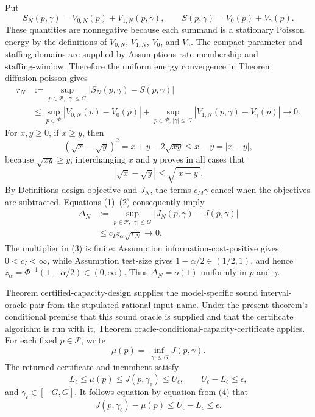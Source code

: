 Put
\[
 S_N(p,\gamma)=V_{0,N}(p)+V_{1,N}(p,\gamma),
 \qquad
 S(p,\gamma)=V_0(p)+V_\gamma(p).
\]
These quantities are nonnegative because each summand is a stationary Poisson energy by the definitions of \(V_{0,N}\), \(V_{1,N}\), \(V_0\), and \(V_\gamma\).  The compact parameter and staffing domains are supplied by Assumptions \(\mathrm{rate\mbox{-}membership}\) and \(\mathrm{staffing\mbox{-}window}\).  Therefore the uniform energy convergence in Theorem \(\mathrm{diffusion\mbox{-}poisson}\) gives
\[
\begin{aligned}
 r_N
 &:={\sup}_{p\in\mathcal P,\,|\gamma|\leq G}
       |S_N(p,\gamma)-S(p,\gamma)| \\
 &\leq {\sup}_{p\in\mathcal P}|V_{0,N}(p)-V_0(p)|
   +{\sup}_{p\in\mathcal P,\,|\gamma|\leq G}
       |V_{1,N}(p,\gamma)-V_\gamma(p)|
 \longrightarrow 0 .                                      \tag{1}
\end{aligned}
\]
For \(x,y\geq0\), if \(x\geq y\), then
\[
 (\sqrt{x}-\sqrt{y})^2
 =x+y-2\sqrt{xy}
 \leq x-y=|x-y|,
\]
because \(\sqrt{xy}\geq y\); interchanging \(x\) and \(y\) proves in all cases that
\[
 |\sqrt{x}-\sqrt{y}|\leq\sqrt{|x-y|}.                       \tag{2}
\]
By Definitions \(\mathrm{design\mbox{-}objective}\) and \(J_N\), the terms \(c_M\gamma\) cancel when the objectives are subtracted.  Equations (1)--(2) consequently imply
\[
\begin{aligned}
 \Delta_N
 &:={\sup}_{p\in\mathcal P,\,|\gamma|\leq G}
       |J_N(p,\gamma)-J(p,\gamma)| \\
 &\leq c_I z_\alpha\sqrt{r_N}
 \longrightarrow0 .                                       \tag{3}
\end{aligned}
\]
The multiplier in (3) is finite: Assumption \(\mathrm{information\mbox{-}cost\mbox{-}positive}\) gives \(0<c_I<\infty\), while Assumption \(\mathrm{test\mbox{-}size}\) gives \(1-\alpha/2\in(1/2,1)\), and hence \(z_\alpha=\Phi^{-1}(1-\alpha/2)\in(0,\infty)\).  Thus \(\Delta_N=o(1)\) uniformly in \(p\) and \(\gamma\).

Theorem \(\mathrm{certified\mbox{-}capacity\mbox{-}design}\) supplies the model-specific sound interval-oracle pair from the stipulated rational input name.  Under the present theorem's conditional premise that this sound oracle is supplied and that the certificate algorithm is run with it, Theorem \(\mathrm{oracle\mbox{-}conditional\mbox{-}capacity\mbox{-}certificate}\) applies.  For each fixed \(p\in\mathcal P\), write
\[
 \mu(p)=\inf_{|\gamma|\leq G}J(p,\gamma).
\]
The returned certificate and incumbent satisfy
\[
 L_\epsilon\leq\mu(p)
 \leq J(p,\gamma_\epsilon)
 \leq U_\epsilon,
 \qquad
 U_\epsilon-L_\epsilon\leq\epsilon,                        \tag{4}
\]
and \(\gamma_\epsilon\in[-G,G]\).  It follows equation by equation from (4) that
\[
 J(p,\gamma_\epsilon)-\mu(p)
 \leq U_\epsilon-L_\epsilon
 \leq\epsilon.                                               \tag{5}
\]

